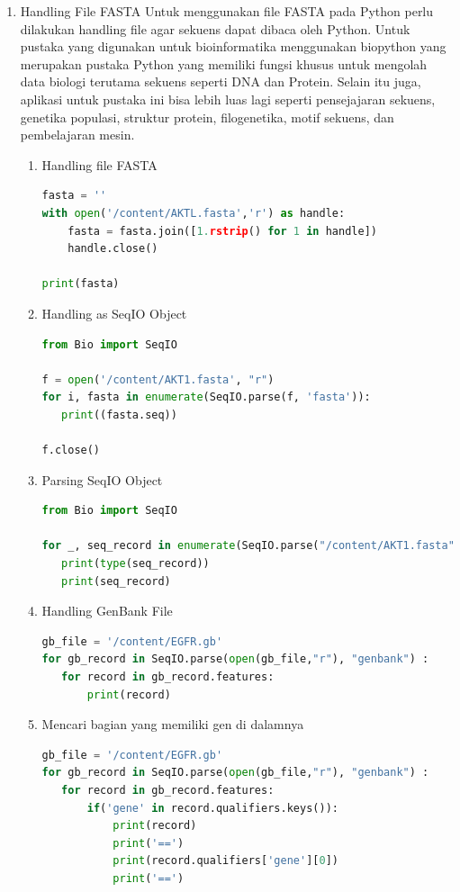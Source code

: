 \documentclass{article}
\begin{document}
\begin{flushleft}
\begin{enumerate}
            \item Handling File FASTA
             Untuk menggunakan file FASTA pada Python perlu dilakukan handling file agar sekuens dapat dibaca oleh Python. Untuk pustaka yang digunakan untuk bioinformatika menggunakan biopython yang merupakan pustaka Python yang memiliki fungsi khusus untuk mengolah data biologi terutama sekuens seperti DNA dan Protein. Selain itu juga, aplikasi untuk pustaka ini bisa lebih luas lagi seperti pensejajaran sekuens, genetika populasi, struktur protein, filogenetika, motif sekuens, dan pembelajaran mesin.
             \begin{enumerate}
                 \item Handling file FASTA
                 \begin{lstlisting}[language=Python]
fasta = ''
with open('/content/AKTL.fasta','r') as handle:
    fasta = fasta.join([1.rstrip() for 1 in handle])
    handle.close()

print(fasta)
                 \end{lstlisting}
                \item Handling as SeqIO Object
                \begin{lstlisting}[language=Python]
from Bio import SeqIO

f = open('/content/AKT1.fasta', "r")
for i, fasta in enumerate(SeqIO.parse(f, 'fasta')):
   print((fasta.seq))

f.close()
                \end{lstlisting}
                \item Parsing SeqIO Object
                \begin{lstlisting}[language=Python]
from Bio import SeqIO

for _, seq_record in enumerate(SeqIO.parse("/content/AKT1.fasta", "fasta")):
   print(type(seq_record))
   print(seq_record)
                \end{lstlisting}
                \item Handling GenBank File
                \begin{lstlisting}[language=Python]
gb_file = '/content/EGFR.gb'
for gb_record in SeqIO.parse(open(gb_file,"r"), "genbank") :
   for record in gb_record.features:
       print(record)
                \end{lstlisting}
                \item Mencari bagian yang memiliki gen di dalamnya
                \begin{lstlisting}[language=Python]
gb_file = '/content/EGFR.gb'
for gb_record in SeqIO.parse(open(gb_file,"r"), "genbank") :
   for record in gb_record.features:
       if('gene' in record.qualifiers.keys()):
           print(record)
           print('==')
           print(record.qualifiers['gene'][0])
           print('==')
                \end{lstlisting}
             \end{enumerate}
        \end{enumerate}
    \end{flushleft}
\end{document}
